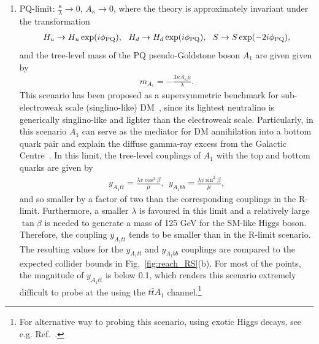 \documentclass[preprintnumbers,superscriptaddress,nofootinbib,aps,prd,floatfix]{revtex4}
\begin{document}
\begin{enumerate}
\item PQ-limit: $\frac{\kappa}{\lambda} \to 0$, $A_\kappa \to 0$, where the theory is approximately invariant under the transformation 
\begin{eqnarray}
H_u \to H_u \exp(i \phi_{\rm PQ}), \ \ H_d \to H_d \exp(i \phi_{\rm PQ}), \ \ S \to S \exp(-2i \phi_{\rm PQ}), 
\end{eqnarray}
and the tree-level mass of the PQ pseudo-Goldstone boson $A_1$ are given given by  
\begin{eqnarray}
m_{A_1} = - \frac{3 \kappa A_\kappa \mu}{\lambda}.
\end{eqnarray}
This scenario has been proposed as a supersymmetric benchmark for sub-electroweak scale (singlino-like) DM~\cite{Draper:2010ew}, since its lightest neutralino is generically singlino-like and lighter than the electroweak scale. Particularly, in this scenario $A_1$ can serve as the mediator for  DM annihilation into a bottom quark pair and explain the diffuse gamma-ray excess from the Galactic Centre~\cite{Huang:2014cla,Cheung:2014lqa}. In this limit, the tree-level couplings of $A_1$ with the top and bottom quarks are given by 
\begin{eqnarray}
y_{A_1 tt} = \frac{\lambda v \cos^2 \beta}{\mu}, \ \ y_{A_1 bb} = \frac{\lambda v \sin^2 \beta}{\mu},
\end{eqnarray}
and so smaller by a factor of two than the corresponding couplings in the R-limit. Furthermore, a smaller $\lambda$ is favoured in this limit and a relatively large $\tan\beta$ is needed to generate a mass of 125 GeV for the SM-like Higgs boson. Therefore, the coupling $y_{A_1 tt}$ tends to be smaller than in the R-limit scenario. 
The resulting values for the $y_{A_1tt}$ and $y_{A_1bb}$ couplings are compared to the expected collider bounds in Fig.~\ref{fig:reach_RS}(b).
For most of the points, the magnitude of $y_{A_1 tt}$ is below 0.1, which renders this scenario extremely difficult to probe at the using the $t\bar tA_1$ channel.\footnote{For alternative way to probing this scenario, using exotic Higgs decays, see e.g. Ref.~\cite{Huang:2013ima,Huang:2014cla,Butter:2015fqa}.}
 

\end{enumerate}
\end{document}
